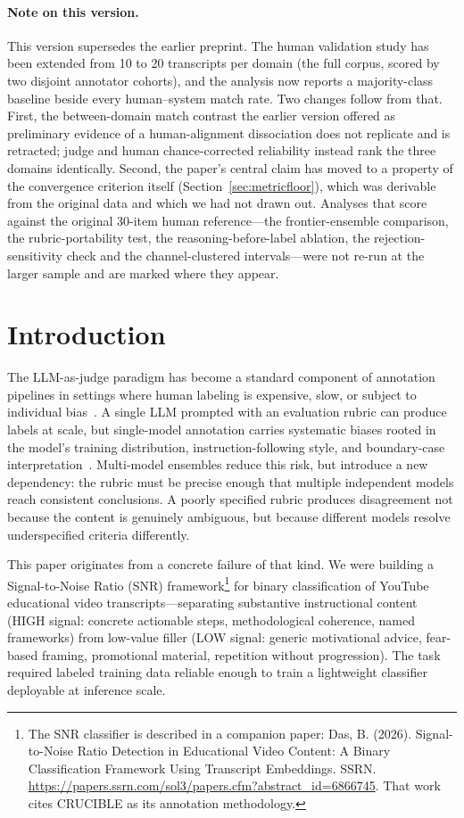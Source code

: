 \documentclass[11pt]{article}
\begin{document}
\paragraph{Note on this version.}
This version supersedes the earlier preprint. The human validation study
has been extended from 10 to 20 transcripts per domain (the full corpus,
scored by two disjoint annotator cohorts), and the analysis now reports a
majority-class baseline beside every human--system match rate. Two changes
follow from that. First, the between-domain match contrast the earlier
version offered as preliminary evidence of a human-alignment dissociation
does not replicate and is retracted; judge and human chance-corrected
reliability instead rank the three domains identically. Second, the
paper's central claim has moved to a property of the convergence criterion
itself (Section~\ref{sec:metricfloor}), which was derivable from the
original data and which we had not drawn out. Analyses that score against
the original 30-item human reference---the frontier-ensemble comparison,
the rubric-portability test, the reasoning-before-label ablation, the
rejection-sensitivity check and the channel-clustered intervals---were not
re-run at the larger sample and are marked where they appear.

\section{Introduction}

The LLM-as-judge paradigm has become a standard component of annotation
pipelines in settings where human labeling is expensive, slow, or subject to
individual bias~\cite{zheng2023judging}. A single LLM prompted with an
evaluation rubric can produce labels at scale, but single-model annotation
carries systematic biases rooted in the model's training distribution,
instruction-following style, and boundary-case
interpretation~\cite{shi2024judging}. Multi-model ensembles reduce this risk,
but introduce a new dependency: the rubric must be precise enough that multiple
independent models reach consistent conclusions. A poorly specified rubric
produces disagreement not because the content is genuinely ambiguous, but
because different models resolve underspecified criteria differently.

This paper originates from a concrete failure of that kind. We were building a
Signal-to-Noise Ratio (SNR) framework\footnote{The SNR classifier is described
in a companion paper: Das, B.
(2026). Signal-to-Noise Ratio Detection in Educational Video Content: A
Binary Classification Framework Using Transcript Embeddings. SSRN.
\url{https://papers.ssrn.com/sol3/papers.cfm?abstract_id=6866745}. That
work cites CRUCIBLE as its annotation methodology.} for binary classification of YouTube educational video
transcripts---separating substantive instructional content (HIGH signal:
concrete actionable steps, methodological coherence, named frameworks) from
low-value filler (LOW signal: generic motivational advice, fear-based framing,
promotional material, repetition without progression). The task required
labeled training data reliable enough to train a lightweight classifier
deployable at inference scale.
\end{document}

